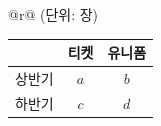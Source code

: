 \begin{tabular}{@{}r@{}}
{\footnotesize (단위: 장)} \\[-1pt]
\begin{tabular}{|c|c|c|}
\hline
 & 티켓 & 유니폼 \\
\hline
상반기 & $a$ & $b$ \\
\hline
하반기 & $c$ & $d$ \\
\hline
\end{tabular}
\end{tabular}
